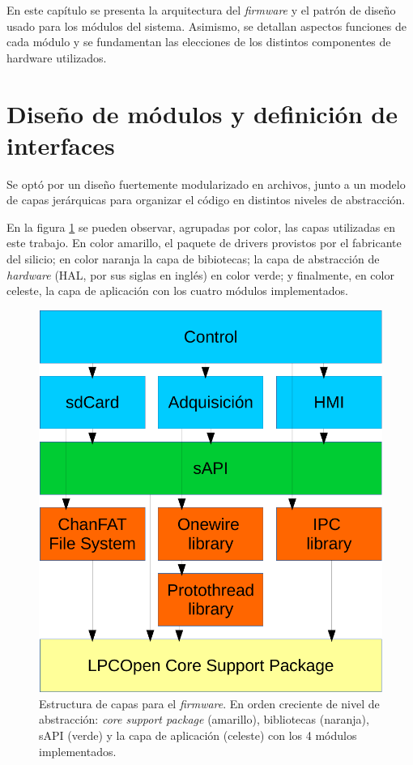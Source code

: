 En este capítulo se presenta la arquitectura del \textit{firmware} y el patrón de diseño usado para los módulos del sistema.  Asimismo, se detallan aspectos funciones de cada módulo y se fundamentan las elecciones de los distintos componentes de hardware utilizados.

\section{Diseño de módulos y definición de interfaces}
\label{sec:modulos}

Se optó por un diseño fuertemente modularizado en archivos, junto a un modelo de capas jerárquicas para organizar el código en distintos niveles de abstracción.  

En la figura \ref{fig:capas} se pueden observar, agrupadas por color, las capas utilizadas en este trabajo.  En color amarillo, el paquete de drivers provistos por el fabricante del silicio; en color naranja la capa de bibiotecas; la capa de abstracción de \textit{hardware} (HAL, por sus siglas en inglés) en color verde; y finalmente, en color celeste, la capa de aplicación con los cuatro módulos implementados.   


\begin{figure}[ht]
	\centering
	\includegraphics[width=.55\textwidth]{./Figures/capas.pdf}
	\caption[Estructura de capas para el \textit{firmware}.]{Estructura de capas para el \textit{firmware}. En orden creciente de nivel de abstracción: \textit{core support package} (amarillo), bibliotecas (naranja), sAPI (verde) y la capa de aplicación (celeste) con los 4 módulos implementados.}
	\label{fig:capas}
\end{figure}

